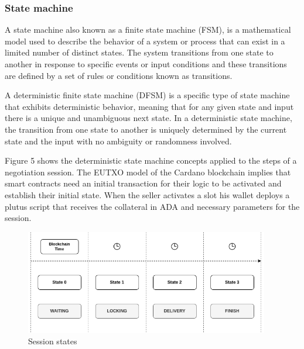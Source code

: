 \documentclass[12pt]{article}
\begin{document}
\subsubsection { State machine }
A state machine also known as a finite state machine (FSM), is a mathematical model used to describe the behavior of a system or process that can exist in a limited number of distinct states. The system transitions from one state to another in response to specific events or input conditions and these transitions are defined by a set of rules or conditions known as transitions.

A deterministic finite state machine (DFSM) is a specific type of state machine that exhibits deterministic behavior, meaning that for any given state and input there is a unique and unambiguous next state. In a deterministic state machine, the transition from one state to another is uniquely determined by the current state and the input with no ambiguity or randomness involved.

Figure 5 shows the deterministic state machine concepts applied to the steps of a negotiation session. 
The EUTXO model of the Cardano blockchain implies that smart contracts need an initial transaction for their logic to be activated and establish their initial state.
When the seller activates a slot his wallet deploys a plutus script that receives the collateral in ADA and necessary parameters for the session. 

\begin{figure}[ht]
  \centering
  \includegraphics[width=0.95\textwidth]{machine.png}
  \caption{Session states}
  \label{fig:States}
\end{figure}
\end{document}
